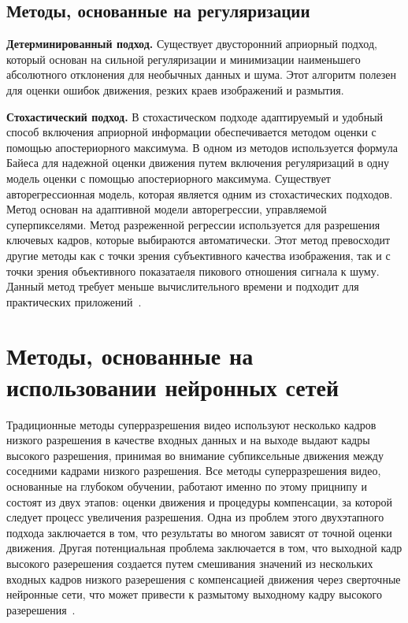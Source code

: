 \documentclass{bmstu}
\begin{document}
\subsection{Методы, основанные на регуляризации}

\textbf{Детерминированный подход.} 
Существует двусторонний априорный подход, который основан на сильной регуляризации и минимизации наименьшего абсолютного отклонения для необычных данных и шума. 
Этот алгоритм полезен для оценки ошибок движения, резких краев изображений и размытия. 

\textbf{Стохастический подход.} 
В стохастическом подходе адаптируемый и удобный способ включения априорной информации обеспечивается методом оценки с помощью апостериорного максимума. 
В одном из методов используется формула Байеса для надежной оценки движения путем включения регуляризаций в одну модель оценки с помощью апостериорного максимума. 
Существует авторегрессионная модель, которая является одним из стохастических подходов. 
Метод основан на адаптивной модели авторегрессии, управляемой суперпикселями. 
Метод разреженной регрессии используется для разрешения ключевых кадров, которые выбираются автоматически. 
Этот метод превосходит другие методы как с точки зрения субъективного качества изображения, так и с точки зрения объективного показатаеля пикового отношения сигнала к шуму. 
Данный метод требует меньше вычислительного времени и подходит для практических приложений~\cite{Daithankar2021}.

\section{Методы, основанные на использовании нейронных сетей}

Традиционные методы суперразрешения видео используют несколько кадров низкого разрешения в качестве входных данных и на выходе выдают кадры высокого разрешения, принимая во внимание субпиксельные движения между соседними кадрами низкого разрешения. 
Все методы суперразрешения видео, основанные на глубоком обучении, работают именно по этому прицнипу и состоят из двух этапов: оценки движения и процедуры компенсации, за которой следует процесс увеличения разрешения. 
Одна из проблем этого двухэтапного подхода заключается в том, что результаты во многом зависят от точной оценки движения. 
Другая потенциальная проблема заключается в том, что выходной кадр высокого разерешения создается путем смешивания значений из нескольких входных кадров низкого разерешения с компенсацией движения через сверточные нейронные сети, что может привести к размытому выходному кадру высокого разерешения~\cite{Younghyun2018}.
\end{document}
